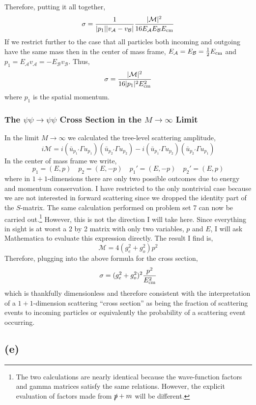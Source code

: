 \documentclass[12pt]{article}
\begin{document}
Therefore, putting it all together,
\[ \sigma = \frac{1}{|p_1| |v_{\mathcal{A}} - v_{\mathcal{B}}|} \frac{| \mathcal{M} |^2}{16 E_{\mathcal{A}} E_{\mathcal{B}} E_{\mathrm{cm}} } \]
If we restrict further to the case that all particles both incoming and outgoing have the same mass then in the center of mass frame, $E_{\mathcal{A}} = E_{\mathcal{B}} = \tfrac{1}{2} E_{\mathrm{cm}}$ and $p_1 = E_{\mathcal{A}} v_{\mathcal{A}} = - E_{\mathcal{B}} v_{\mathcal{B}}$. Thus,
\[ \sigma = \frac{| \mathcal{M} |^2}{16 |p_1|^2 E_{\mathrm{cm}}^2 } \]
where $p_1$ is the spatial momentum. 

\subsubsection{The $\psi \psi \to \psi \psi$ Cross Section in the $M \to \infty$ Limit}
In the limit $M \to \infty$ we calculated the tree-level scattering amplitude,
\[ i \mathcal{M} = i(\bar{u}_{p_1'} \Gamma u_{p_1}) (\bar{u}_{p_2'} \Gamma u_{p_2}) - i (\bar{u}_{p_1'} \Gamma u_{p_2}) (\bar{u}_{p_2'} \Gamma u_{p_1}) \]
In the center of mass frame we write,
\[ p_1 = (E, p) \quad p_2 = (E, -p) \quad p_1' = (E, -p) \quad p_2' = (E, p) \]
where in $1 + 1$-dimensions there are only two possible outcomes due to energy and momentum conservation. I have restricted to the only nontrivial case because we are not interested in forward scattering since we dropped the identity part of the $S$-matrix.  The same calculation performed on problem set 7 can now be carried out.\footnote{The two calculations are nearly identical because the wave-function factors and gamma matrices satisfy the same relations. However, the explicit evaluation of factors made from $\slashed{p} + m$ will be different.} However, this is not the direction I will take here. Since everything in sight is at worst a 2 by 2 matrix with only two variables, $p$ and $E$, I will ask Mathematica to evaluate this expression directly. 
The result I find is,
\[ \mathcal{M} = 4 (g_e^2 + g_o^2) p^2 \]
Therefore, plugging into the above formula for the cross section,
\[ \sigma = (g_e^2 + g_o^2)^2 \frac{p^2}{E_{\mathrm{cm}}^2} \]
which is thankfully dimensionless and therefore consistent with the interpretation of a $1+1$-dimension scattering ``cross section'' as being the fraction of scattering events to incoming particles or equivalently the probability of a scattering event occurring. 

\subsection{(e)}
\end{document}
